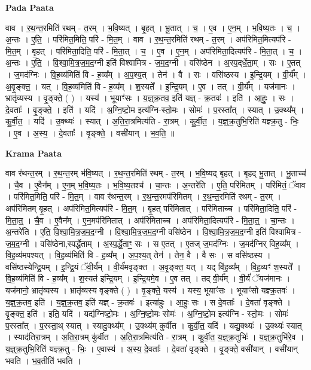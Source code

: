 \documentclass[17pt]{extarticle}
\begin{document}
\textbf{Pada Paata} \newline

वाव । र॒थ॒न्त॒रमिति॑ रथम् - त॒रम् । भ॒वि॒ष्यत् । बृ॒हत् । भू॒तात् । च॒ । ए॒व । ए॒न॒म् । भ॒वि॒ष्य॒तः । च॒ । अ॒न्तः । ए॒ति॒ । परि॑मित॒मिति॒ परि॑ - मि॒त॒म् । वाव । र॒थ॒न्त॒रमिति॑ रथम् - त॒रम् । अप॑रिमित॒मित्यप॑रि - मि॒त॒म् । बृ॒हत् । परि॑मिता॒दिति॒ परि॑ - मि॒ता॒त् । च॒ । ए॒व । ए॒न॒म् । अप॑रिमिता॒दित्यप॑रि - मि॒ता॒त् । च॒ । अ॒न्तः । ए॒ति॒ । वि॒श्वा॒मि॒त्र॒ज॒म॒द॒ग्नी इति॑ विश्वामित्र - ज॒म॒द॒ग्नी । वसि॑ष्ठेन । अ॒स्प॒द्‌र्धे॒ता॒म् । सः । ए॒तत् । ज॒मद॑ग्निः । वि॒ह॒व्य॑मिति॑ वि - ह॒व्य᳚म् । अ॒प॒श्य॒त् । तेन॑ । वै । सः । वसि॑ष्ठस्य । इ॒न्द्रि॒यम् । वी॒र्य᳚म् । अ॒वृ॒ङ्क्त॒ । यत् । वि॒ह॒व्य॑मिति॑ वि - ह॒व्य᳚म् । श॒स्यते᳚ । इ॒न्द्रि॒यम् । ए॒व । तत् । वी॒र्य᳚म् । यज॑मानः । भ्रातृ॑व्यस्य । वृ॒ङ्क्ते॒ ( ) । यस्य॑ । भूयाꣳ॑सः । य॒ज्ञ्॒क्र॒तव॒ इति॑ यज्ञ् - क्र॒तवः॑ । इति॑ । आ॒हुः॒ । सः । दे॒वताः᳚ । वृ॒ङ्क्ते॒ । इति॑ । यदि॑ । अ॒ग्नि॒ष्टो॒म इत्य॑ग्नि-स्तो॒मः । सोमः॑ । प॒रस्ता᳚त् । स्यात् । उ॒क्थ्य᳚म् । कु॒र्वी॒त॒ । यदि॑ । उ॒क्थ्यः॑ । स्यात् । अ॒ति॒रा॒त्रमित्य॑ति - रा॒त्रम् । कु॒र्वी॒त॒ । य॒ज्ञ्॒क्र॒तुभि॒रिति॑ यज्ञ्क्र॒तु - भिः॒ । ए॒व । अ॒स्य॒ । दे॒वताः᳚ । वृ॒ङ्क्ते॒ । वसी॑यान् । भ॒व॒ति॒ ॥  \newline


\textbf{Krama Paata} \newline

वाव र॑थन्त॒रम् । र॒थ॒न्त॒रम् भ॑वि॒ष्यत् । र॒थ॒न्त॒रमिति॑ रथम् - त॒रम् । भ॒वि॒ष्यद् बृ॒हत् । बृ॒हद् भू॒तात् । भू॒ताच्च॑ । चै॒व । ए॒वैन᳚म् । ए॒न॒म् भ॒वि॒ष्य॒तः । भ॒वि॒ष्य॒तश्च॑ । चा॒न्तः । अ॒न्तरे॑ति । ए॒ति॒ परि॑मितम् । परि॑मितं॒ ॅवाव । परि॑मित॒मिति॒ परि॑ - मि॒त॒म् । वाव र॑थन्त॒रम् । र॒थ॒न्त॒रमप॑रिमितम् । र॒थ॒न्त॒रमिति॑ रथम् - त॒रम् । अप॑रिमितम् बृ॒हत् । अप॑रिमित॒मित्यप॑रि - मि॒त॒म् । बृ॒हत् परि॑मितात् । परि॑मिताच्च । परि॑मिता॒दिति॒ परि॑ - मि॒ता॒त्॒ । चै॒व । ए॒वैन᳚म् । ए॒न॒मप॑रिमितात् । अप॑रिमिताच्च । अप॑रिमिता॒दित्यप॑रि - मि॒ता॒त्॒ । चा॒न्तः । अ॒न्तरे॑ति । ए॒ति॒ वि॒श्वा॒मि॒त्र॒ज॒म॒द॒ग्नी । वि॒श्वा॒मि॒त्र॒ज॒म॒द॒ग्नी वसि॑ष्ठेन । वि॒श्वा॒मि॒त्र॒ज॒म॒द॒ग्नी इति॑ विश्वामित्र - ज॒म॒द॒ग्नी । वसि॑ष्ठेना,स्पर्द्धेताम् । अ॒स्प॒र्द्धे॒ताꣳ॒॒ सः । स ए॒तत् । ए॒तज् ज॒मद॑ग्निः । ज॒मद॑ग्निर् विह॒व्य᳚म् । वि॒ह॒व्य॑मपश्यत् । वि॒ह॒व्य॑मिति॑ वि - ह॒व्य᳚म् । अ॒प॒श्य॒त् तेन॑ । तेन॒ वै । वै सः । स वसि॑ष्ठस्य । वसि॑ष्ठस्येन्द्रि॒यम् । इ॒न्द्रि॒यं ॅवी॒र्य᳚म् । वी॒र्य॑मवृङ्क्त । अ॒वृ॒ङ्क्त॒ यत् । यद् वि॑ह॒व्य᳚म् । वि॒ह॒व्यꣳ॑ श॒स्यते᳚ । वि॒ह॒व्य॑मिति॑ वि - ह॒व्य᳚म् । श॒स्यत॑ इन्द्रि॒यम् । इ॒न्द्रि॒यमे॒व । ए॒व तत् । तद् वी॒र्य᳚म् । वी॒र्यं॑ ॅयज॑मानः । यज॑मानो॒ भ्रातृ॑व्यस्य । भ्रातृ॑व्यस्य वृङ्क्ते ( ) । वृ॒ङ्क्ते॒ यस्य॑ । यस्य॒ भूयाꣳ॑सः । भूयाꣳ॑सो यज्ञ्क्र॒तवः॑ । य॒ज्ञ्॒क्र॒तव॒ इति॑ । य॒ज्ञ्॒क्र॒तव॒ इति॑ यज्ञ् - क्र॒तवः॑ । इत्या॑हुः । आ॒हुः॒ सः । स दे॒वताः᳚ । दे॒वता॑ वृङ्क्ते । वृ॒ङ्क्त॒ इति॑ । इति॒ यदि॑ । यद्य॑ग्निष्टो॒मः । अ॒ग्नि॒ष्टो॒मः सोमः॑ । अ॒ग्नि॒ष्टो॒म इत्य॑ग्नि - स्तो॒मः । सोमः॑ प॒रस्ता᳚त् । प॒रस्ता॒थ् स्यात् । स्यादु॒क्थ्य᳚म् । उ॒क्थ्य॑म् कुर्वीत । कु॒र्वी॒त॒ यदि॑ । यद्यु॒क्थ्यः॑ । उ॒क्थ्यः॑ स्यात् । स्याद॑तिरा॒त्रम् । अ॒ति॒रा॒त्रम् कु॑र्वीत । अ॒ति॒रा॒त्रमित्य॑ति - रा॒त्रम् । कु॒र्वी॒त॒ य॒ज्ञ्॒क्र॒तुभिः॑ । य॒ज्ञ्॒क्र॒तुभि॑रे॒व । य॒ज्ञ्॒क्र॒तुभि॒रिति॑ यज्ञ्क्र॒तु - भिः॒ । ए॒वास्य॑ । अ॒स्य॒ दे॒वताः᳚ । दे॒वता॑ वृङ्क्ते । वृ॒ङ्क्ते॒ वसी॑यान् । वसी॑यान् भवति । भ॒व॒तीति॑ भवति । \newline
\end{document}
